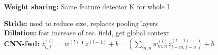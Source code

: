\textbf{Weight sharing:} Same feature detector K for whole I\\

\textbf{Stride:} used to reduce size, replaces pooling layers\\
\textbf{Dillation:} fast increase of rec. field, get global context\\

\textbf{CNN-fwd:} $z_{i,j}^{(l)} = w^{(l)} * z^{(l-1)} + b = (\sum_{m,n} w_{m,n}^{(l)} z_{i-m, j-n}^{(l-1)}) + b$

